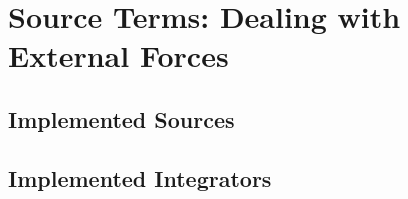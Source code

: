 \section{Source Terms: Dealing with External Forces}\label{chap:sources}






\subsection{Implemented Sources}\label{chap:implemented-sources}




\subsection{Implemented Integrators}\label{chap:integrators}
